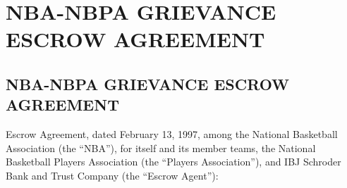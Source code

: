 \documentclass[
]{book}
\begin{document}
\hypertarget{nba-nbpa-grievance-escrow-agreement}{%
\chapter{NBA-NBPA GRIEVANCE ESCROW AGREEMENT}\label{nba-nbpa-grievance-escrow-agreement}}

\hypertarget{nba-nbpa-grievance-escrow-agreement-1}{%
\section{NBA-NBPA GRIEVANCE ESCROW AGREEMENT}\label{nba-nbpa-grievance-escrow-agreement-1}}

Escrow Agreement, dated February 13, 1997, among the National Basketball Association (the ``NBA''), for itself and its member teams, the National Basketball Players Association (the ``Players Association''), and IBJ Schroder Bank and Trust Company (the ``Escrow Agent''):
\end{document}
